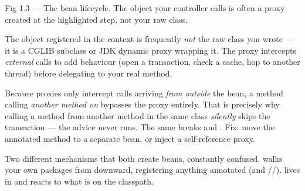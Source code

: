 \begin{wbfigure}{Fig 1.3 — The bean lifecycle. The object your controller calls is often a proxy created at the highlighted step, not your raw class.}
\end{wbfigure}

\begin{behind}
The object registered in the context is frequently \emph{not} the raw class you wrote — it is a CGLIB subclass or JDK dynamic proxy wrapping it. The proxy intercepts \emph{external} calls to add behaviour (open a transaction, check a cache, hop to another thread) before delegating to your real method.
\end{behind}

\begin{secwarn}
Because proxies only intercept calls arriving \emph{from outside} the bean, a method calling \emph{another method on } bypasses the proxy entirely. That is precisely why calling a  method from another method in the same class \emph{silently} skips the transaction — the advice never runs. The same breaks  and . Fix: move the annotated method to a separate bean, or inject a self-reference proxy.
\end{secwarn}


 Two different mechanisms that both create beans, constantly confused.  walks your own packages from  downward, registering anything annotated  (and //).  lives in  and reacts to what is on the classpath.

